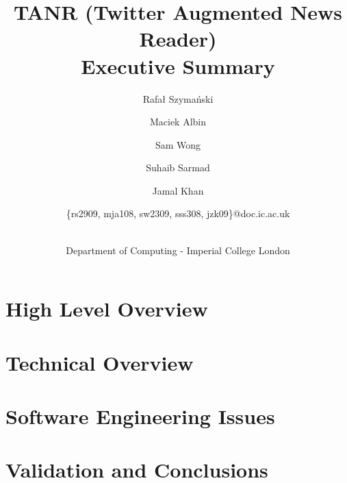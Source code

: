 \documentclass[a4paper,12pt]{article}
\title{TANR (Twitter Augmented News Reader)\\Executive Summary\\}
\author{
    \small{Rafał Szymański}\\
  	\and
    \small{Maciek Albin}\\
    \and
    \small{Sam Wong}\\
    \and  
    \small{Suhaib Sarmad}\\
		\and
		\small{Jamal Khan}\\
		\and
		\small{\{rs2909, mja108, sw2309, sss308, jzk09\}@doc.ic.ac.uk}
		\and
		\\Department of Computing - Imperial College London
}
\date{}
\begin{document}
 
	\maketitle
	
  \section{High Level Overview}
  
  \section{Technical Overview}
  
  \section{Software Engineering Issues}
  
  \section{Validation and Conclusions}
  
\end{document}
